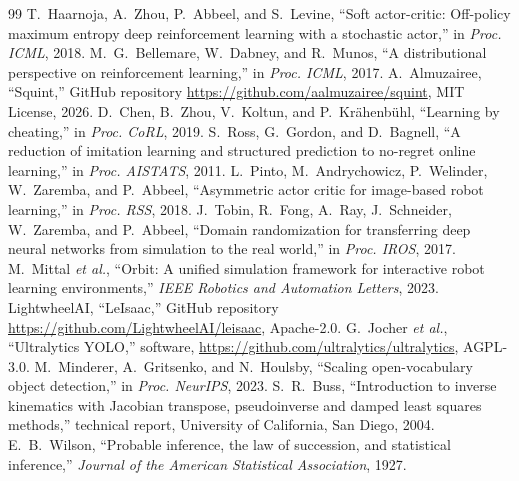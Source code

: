 \documentclass[conference,10pt]{IEEEtran}
\begin{document}
\begin{thebibliography}{99}
 T.~Haarnoja, A.~Zhou, P.~Abbeel, and S.~Levine, ``Soft actor-critic: Off-policy maximum
entropy deep reinforcement learning with a stochastic actor,'' in \emph{Proc. ICML}, 2018.
 M.~G.~Bellemare, W.~Dabney, and R.~Munos, ``A distributional perspective on reinforcement
learning,'' in \emph{Proc. ICML}, 2017.
 A.~Almuzairee, ``Squint,'' GitHub repository \url{https://github.com/aalmuzairee/squint}, MIT License, 2026.
 D.~Chen, B.~Zhou, V.~Koltun, and P.~Kr\"ahenb\"uhl, ``Learning by cheating,'' in \emph{Proc. CoRL},
2019.
 S.~Ross, G.~Gordon, and D.~Bagnell, ``A reduction of imitation learning and structured prediction
to no-regret online learning,'' in \emph{Proc. AISTATS}, 2011.
 L.~Pinto, M.~Andrychowicz, P.~Welinder, W.~Zaremba, and P.~Abbeel, ``Asymmetric actor
critic for image-based robot learning,'' in \emph{Proc. RSS}, 2018.
 J.~Tobin, R.~Fong, A.~Ray, J.~Schneider, W.~Zaremba, and P.~Abbeel, ``Domain randomization for
transferring deep neural networks from simulation to the real world,'' in \emph{Proc. IROS}, 2017.
 M.~Mittal \emph{et al.}, ``Orbit: A unified simulation framework for interactive robot learning
environments,'' \emph{IEEE Robotics and Automation Letters}, 2023.
 LightwheelAI, ``LeIsaac,'' GitHub repository \url{https://github.com/LightwheelAI/leisaac}, Apache-2.0.
 G.~Jocher \emph{et al.}, ``Ultralytics YOLO,'' software, \url{https://github.com/ultralytics/ultralytics}, AGPL-3.0.
 M.~Minderer, A.~Gritsenko, and N.~Houlsby, ``Scaling open-vocabulary object detection,'' in
\emph{Proc. NeurIPS}, 2023.
 S.~R.~Buss, ``Introduction to inverse kinematics with Jacobian transpose, pseudoinverse and damped
least squares methods,'' technical report, University of California, San Diego, 2004.
 E.~B.~Wilson, ``Probable inference, the law of succession, and statistical inference,''
\emph{Journal of the American Statistical Association}, 1927.
\end{thebibliography}
\end{document}
